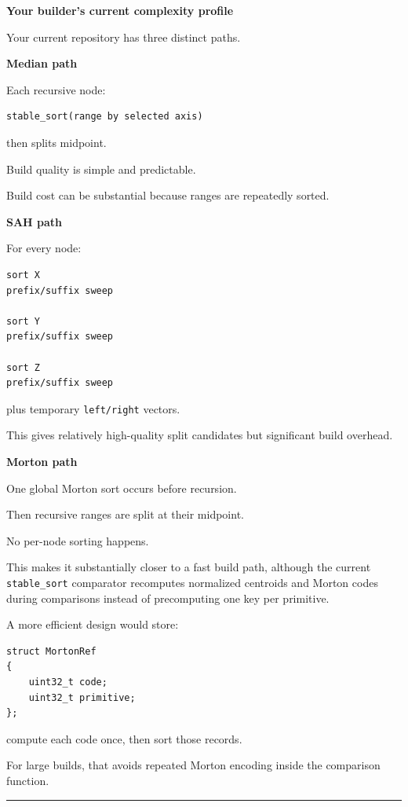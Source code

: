 \textbf{Your builder's current complexity profile}

Your current repository has three distinct paths.

\textbf{Median path}

Each recursive node:

\begin{verbatim}
stable_sort(range by selected axis)
\end{verbatim}

then splits midpoint.

Build quality is simple and predictable.

Build cost can be substantial because ranges are repeatedly sorted.

\textbf{SAH path}

For every node:

\begin{verbatim}
sort X
prefix/suffix sweep

sort Y
prefix/suffix sweep

sort Z
prefix/suffix sweep
\end{verbatim}

plus temporary \texttt{left/right} vectors.

This gives relatively high-quality split candidates but significant build overhead.

\textbf{Morton path}

One global Morton sort occurs before recursion.

Then recursive ranges are split at their midpoint.

No per-node sorting happens.

This makes it substantially closer to a fast build path, although the current \texttt{stable\_sort} comparator recomputes normalized centroids and Morton codes during comparisons instead of precomputing one key per primitive.

A more efficient design would store:

\begin{verbatim}
struct MortonRef
{
    uint32_t code;
    uint32_t primitive;
};
\end{verbatim}

compute each code once, then sort those records.

For large builds, that avoids repeated Morton encoding inside the comparison function.

\begin{center}\rule{0.5\linewidth}{0.5pt}\end{center}

